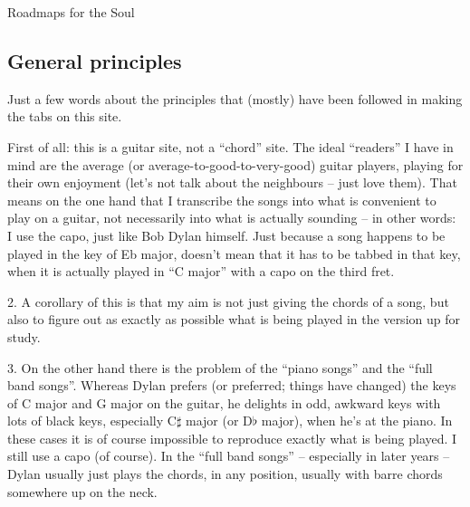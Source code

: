 
\thispagestyle{empty}
\label{roadmaps}

\vspace*{20ex}

\begin{articlelayout}
\begin{flushright}{\Huge Roadmaps for the Soul}\end{flushright}

\vspace{5ex}

\subsection*{General principles}

Just a few words about the principles that (mostly) have been followed
in making the tabs on this site.

First of all: this is a guitar site, not a ``{}chord''{} site. The
ideal ``{}readers''{} I have in mind are the average (or
average-to-good-to-very-good) guitar players, playing for their own
enjoyment (let's not talk about the neighbours -- just love
them). That means on the one hand that I transcribe the songs into
what is convenient to play on a guitar, not necessarily into what is
actually sounding -- in other words: I use the capo, just like Bob Dylan
himself. Just because a song happens to be played in the key of Eb
major, doesn't mean that it has to be tabbed in that key, when it is
actually played in ``{}C major''{} with a capo on the third fret.

2. A corollary of this is that my aim is not just giving the chords of
a song, but also to figure out as exactly as possible what is being
played in the version up for study.

3. On the other hand there is the problem of the ``{}piano songs''{}
and the ``{}full band songs''{}. Whereas Dylan prefers (or preferred;
things have changed) the keys of C major and G major on the guitar, he
delights in odd, awkward keys with lots of black keys, especially
C$\sharp$ major (or D$\flat$ major), when he's at the piano. In these
cases it is of course impossible to reproduce exactly what is being
played. I still use a capo (of course). In the ``{}full band songs''{}
-- especially in later years -- Dylan usually just plays the chords,
in any position, usually with barre chords somewhere up on the neck.


\end{articlelayout}
